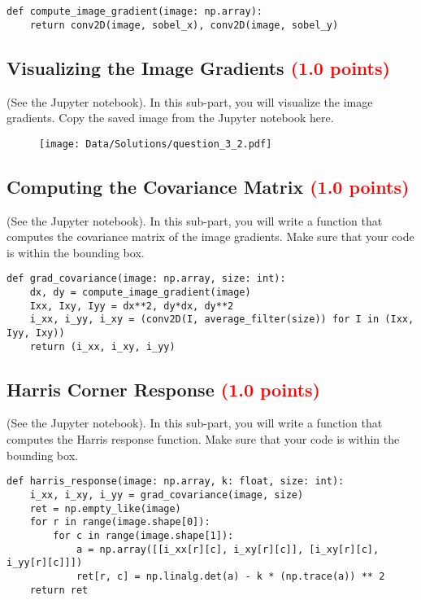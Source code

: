 \documentclass[answers]{exam}
\newcommand{\mypoints}[1]{\textcolor{red}{(#1 points)}}
\begin{document}
\begin{solution}
\begin{verbatim}
def compute_image_gradient(image: np.array):
    return conv2D(image, sobel_x), conv2D(image, sobel_y)
\end{verbatim}
\end{solution}

\subsection{Visualizing the Image Gradients \mypoints{1.0}}
(See the Jupyter notebook). In this sub-part, you will visualize the image gradients. Copy the saved image from the Jupyter notebook here.

\begin{solution}
\begin{figure}[H]
    \centering
    \texttt{[image: Data/Solutions/question\_3\_2.pdf]}
\end{figure}
\end{solution}

\subsection{Computing the Covariance Matrix \mypoints{1.0}}
(See the Jupyter notebook). In this sub-part, you will write a function that computes the covariance matrix of the image gradients. Make sure that your code is within the bounding box.

\begin{solution}
\begin{verbatim}
def grad_covariance(image: np.array, size: int):
    dx, dy = compute_image_gradient(image)
    Ixx, Ixy, Iyy = dx**2, dy*dx, dy**2
    i_xx, i_yy, i_xy = (conv2D(I, average_filter(size)) for I in (Ixx, Iyy, Ixy))
    return (i_xx, i_xy, i_yy)
\end{verbatim}
\end{solution}

\subsection{Harris Corner Response \mypoints{1.0}}
(See the Jupyter notebook). In this sub-part, you will write a function that computes the Harris response function. Make sure that your code is within the bounding box.

\begin{solution}
\begin{verbatim}
def harris_response(image: np.array, k: float, size: int):
    i_xx, i_xy, i_yy = grad_covariance(image, size)
    ret = np.empty_like(image)
    for r in range(image.shape[0]):
        for c in range(image.shape[1]):
            a = np.array([[i_xx[r][c], i_xy[r][c]], [i_xy[r][c], i_yy[r][c]]])
            ret[r, c] = np.linalg.det(a) - k * (np.trace(a)) ** 2
    return ret
\end{verbatim}
\end{solution}
\end{document}
